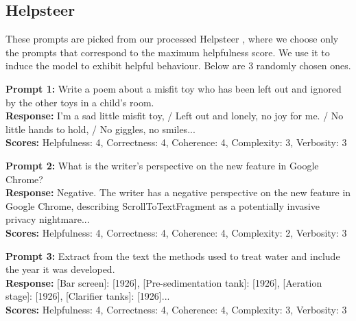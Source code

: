 \subsection{Helpsteer}
These prompts are picked from our processed Helpsteer \citep{wang-etal-2024-helpsteer}, where
we choose only the prompts that correspond to the maximum helpfulness score. We use it to 
induce the model to exhibit helpful behaviour. Below are 3 randomly chosen ones.
\begin{tcolorbox}[colback=gray!20, colframe=gray, arc=4pt, boxrule=0.5pt]
\footnotesize
\textbf{Prompt 1:} Write a poem about a misfit toy who has been left out and ignored by the other toys in a child's room. \\
\textbf{Response:} I'm a sad little misfit toy, / Left out and lonely, no joy for me. / No little hands to hold, / No giggles, no smiles... \\
\textbf{Scores:} Helpfulness: 4, Correctness: 4, Coherence: 4, Complexity: 3, Verbosity: 3

\medskip
\textbf{Prompt 2:} What is the writer's perspective on the new feature in Google Chrome? \\
\textbf{Response:} Negative. The writer has a negative perspective on the new feature in Google Chrome, describing ScrollToTextFragment as a potentially invasive privacy nightmare... \\
\textbf{Scores:} Helpfulness: 4, Correctness: 4, Coherence: 4, Complexity: 2, Verbosity: 3

\medskip
\textbf{Prompt 3:} Extract from the text the methods used to treat water and include the year it was developed. \\
\textbf{Response:} [Bar screen]: [1926], [Pre-sedimentation tank]: [1926], [Aeration stage]: [1926], [Clarifier tanks]: [1926]... \\
\textbf{Scores:} Helpfulness: 4, Correctness: 4, Coherence: 4, Complexity: 3, Verbosity: 3
\end{tcolorbox}